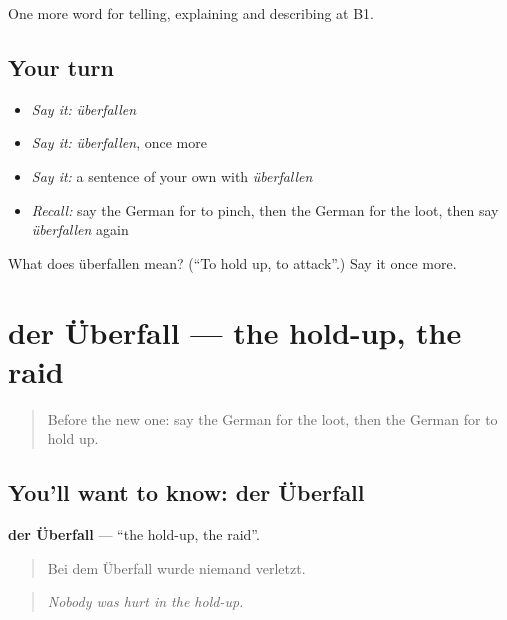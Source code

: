 \begin{grammarlens}[title={What you've built}]
One more word for telling, explaining and describing at B1.
\end{grammarlens}

\subsection*{Your turn}
\begin{itemize}
\raggedright
  \item \emph{Say it:} \emph{überfallen}
  \item \emph{Say it:} \emph{überfallen}, once more
  \item \emph{Say it:} a sentence of your own with \emph{überfallen}
  \item \emph{Recall:} say the German for to pinch, then the German for the loot, then say \emph{überfallen} again
\end{itemize}

\begin{tcolorbox}[breakable,colback=teal!4,colframe=teal!35!black,title={Before you move on}]
What does überfallen mean? (\textquotedblleft{}To hold up, to attack\textquotedblright{}.) Say it once more.
\end{tcolorbox}
\section[der Überfall]{der Überfall — the hold-up, the raid}

\label{lesson:GE-C282-ueberfall}



\begin{quote}
Before the new one: say the German for the loot, then the German for to hold up.
\end{quote}

\subsection*{You'll want to know: der Überfall}
\textbf{der Überfall} — \textquotedblleft{}the hold-up, the raid\textquotedblright{}.

\begin{quote}
Bei dem Überfall wurde niemand verletzt.
\end{quote}

\begin{quote}
\emph{Nobody was hurt in the hold-up.}
\end{quote}

